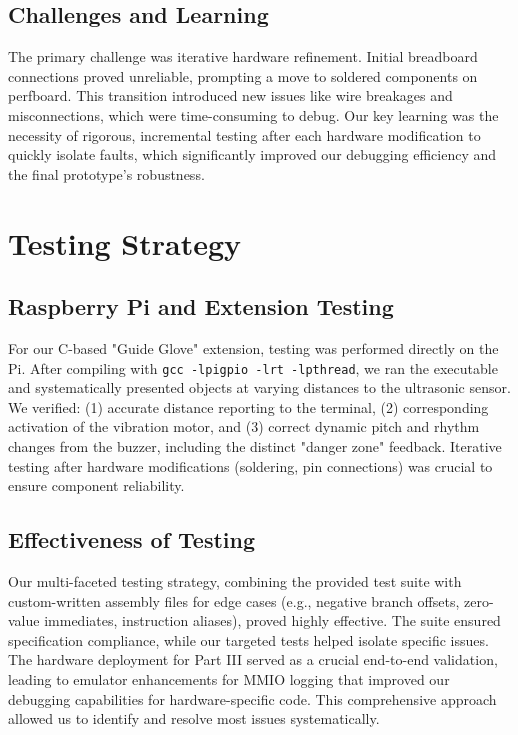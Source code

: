 \documentclass[11pt]{article}
\begin{document}
\subsection{Challenges and Learning}
The primary challenge was iterative hardware refinement. Initial breadboard connections proved unreliable, prompting a move to soldered components on perfboard. This transition introduced new issues like wire breakages and misconnections, which were time-consuming to debug. Our key learning was the necessity of rigorous, incremental testing after each hardware modification to quickly isolate faults, which significantly improved our debugging efficiency and the final prototype's robustness.


\section{Testing Strategy}

\subsection{Raspberry Pi and Extension Testing}
For our C-based "Guide Glove" extension, testing was performed directly on the Pi. After compiling with \texttt{gcc -lpigpio -lrt -lpthread}, we ran the executable and systematically presented objects at varying distances to the ultrasonic sensor. We verified: (1) accurate distance reporting to the terminal, (2) corresponding activation of the vibration motor, and (3) correct dynamic pitch and rhythm changes from the buzzer, including the distinct "danger zone" feedback. Iterative testing after hardware modifications (soldering, pin connections) was crucial to ensure component reliability.

\subsection{Effectiveness of Testing}
Our multi-faceted testing strategy, combining the provided test suite with custom-written assembly files for edge cases (e.g., negative branch offsets, zero-value immediates, instruction aliases), proved highly effective. The suite ensured specification compliance, while our targeted tests helped isolate specific issues. The hardware deployment for Part III served as a crucial end-to-end validation, leading to emulator enhancements for MMIO logging that improved our debugging capabilities for hardware-specific code. This comprehensive approach allowed us to identify and resolve most issues systematically.
\end{document}
